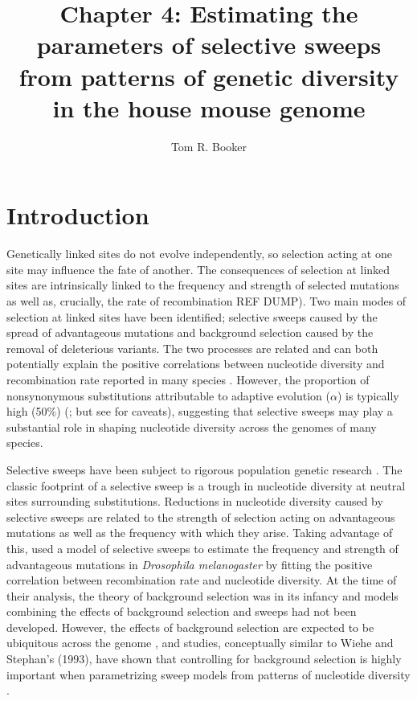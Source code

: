 \documentclass[11pt]{article}
\title{\textbf{Chapter 4:} Estimating the parameters of selective sweeps from patterns of genetic diversity in the house mouse genome}
\author[1,*]{Tom R. Booker}
\affil[1]{Institute of Evolutionary Biology, University of Edinburgh, Edinburgh}
\begin{document}
\maketitle
\begin{abstract}


\end{abstract}

%
%
\section*{Introduction}

Genetically linked sites do not evolve independently, so selection acting at one site may influence the fate of another. The consequences of selection at linked sites are intrinsically linked to the frequency and strength of selected mutations as well as, crucially, the rate of recombination \citep{RN124,RN206,RN287,RN157}
REF DUMP). Two main modes of selection at linked sites have been identified; selective sweeps caused by the spread of advantageous mutations and background selection caused by the removal of deleterious variants. The two processes are related and can both potentially explain the positive correlations between nucleotide diversity and recombination rate reported in many species \citep{RN117}. However, the proportion of nonsynonymous substitutions attributable to adaptive evolution ($\alpha$) is typically high (50\%) (\citealt{RN215}; but see \citealt{RN352} for caveats), suggesting that selective sweeps may play a substantial role in shaping nucleotide diversity across the genomes of many species.

Selective sweeps have been subject to rigorous population genetic research \citep{RN124, RN226, RN278, RN235}. The classic footprint of a selective sweep is a trough in nucleotide diversity at neutral sites surrounding substitutions. Reductions in nucleotide diversity caused by selective sweeps are related to the strength of selection acting on advantageous mutations as well as the frequency with which they arise. Taking advantage of this, \cite{RN277} used a model of selective sweeps to estimate the frequency and strength of advantageous mutations in \textit{Drosophila melanogaster} by fitting the positive correlation between recombination rate and nucleotide diversity. At the time of their analysis, the theory of background selection was in its infancy and models combining the effects of background selection and sweeps had not been developed. However, the effects of background selection are expected to be ubiquitous across the genome \citep{RN116, RN274, RN120}, and studies, conceptually similar to Wiehe and Stephan's (1993), have shown that controlling for background selection is highly important when parametrizing sweep models from patterns of nucleotide diversity \citep{RN290, RN274}.
\end{document}

